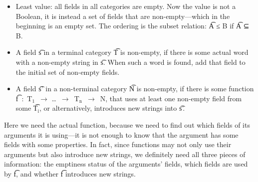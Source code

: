 \begin{itemize}
\setlength\itemsep{0em}
\item Least value: all fields in all categories are empty. Now
  the value is not a Boolean, it is instead a set of fields that are
  non-empty---which in the beginning is an empty set. The ordering
  is the subset relation: \t{A ≤ B} if \t{A ⊆ B}.
\item A field \t{s} in a terminal category \t{T} is non-empty, if
  there is some actual word with a non-empty string in \t{s}. When
  such a word is found, add that field to the initial set of non-empty
  fields.
\item A field \t{s'} in a non-terminal category \t{N} is non-empty, if
  there is some function \t{f~:~T$_\text{1}$~$\rightarrow$
    \dots~$\rightarrow$~T$_\text{n}$~$\rightarrow$~N}, that uses at
  least one non-empty field from some \t{T$_\text{i}$}, or
  alternatively, introduces new strings into \t{s'}.
\end{itemize}

\noindent Here we need the actual \gf{} function, because we need to
find out which fields of its arguments it is using---it is not enough
to know that the argument has some fields with some properties. In
fact, since functions may not only use their arguments but also
introduce new strings, we definitely need all three pieces of
information: the emptiness status of the arguments’ fields, which
fields are used by \t{f}, and whether \t{f} introduces new strings.





